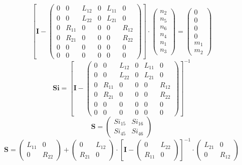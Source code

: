 \[ \left[ \mathbf{I}  - \left(\begin{smallmatrix} 0 & 0 & L_{12} & 0 & L_{11} & 0 \\ 0 & 0 & L_{22} & 0 & L_{21} & 0 \\ 0 & R_{11} & 0 & 0 & 0 & R_{12} \\ 0 & R_{21} & 0 & 0 & 0 & R_{22} \\ 0 & 0 & 0 & 0 & 0 & 0 \\ 0 & 0 & 0 & 0 & 0 & 0 \end{smallmatrix}\right)\right] \cdot \left(\begin{smallmatrix} n_{2} \\ n_{5} \\ n_{6} \\ n_{4} \\ n_{1} \\ n_{3} \end{smallmatrix}\right) = \left(\begin{smallmatrix} 0 \\ 0 \\ 0 \\ 0 \\ m_{1} \\ m_{2} \end{smallmatrix}\right) \]
\[ \mathbf{Si} = \left[ \mathbf{I}  - \left(\begin{smallmatrix} 0 & 0 & L_{12} & 0 & L_{11} & 0 \\ 0 & 0 & L_{22} & 0 & L_{21} & 0 \\ 0 & R_{11} & 0 & 0 & 0 & R_{12} \\ 0 & R_{21} & 0 & 0 & 0 & R_{22} \\ 0 & 0 & 0 & 0 & 0 & 0 \\ 0 & 0 & 0 & 0 & 0 & 0 \end{smallmatrix}\right) \right]^{-1} \]
\[ \mathbf{S} = \left(\begin{smallmatrix} Si_{15} & Si_{16} \\ Si_{45} & Si_{46} \end{smallmatrix}\right) \]
\[ \mathbf{S} = \left(\begin{smallmatrix} L_{11} & 0 \\ 0 & R_{22} \end{smallmatrix}\right) + \left(\begin{smallmatrix} 0 & L_{12} \\ R_{21} & 0 \end{smallmatrix}\right) \cdot \left[ \mathbf{I}  - \left(\begin{smallmatrix} 0 & L_{22} \\ R_{11} & 0 \end{smallmatrix}\right) \right]^{-1} \cdot\left(\begin{smallmatrix} L_{21} & 0 \\ 0 & R_{12} \end{smallmatrix}\right) \]
